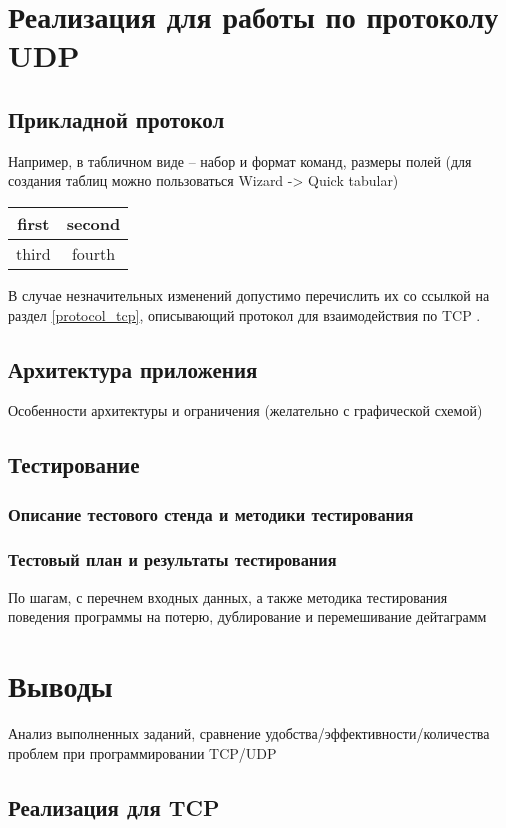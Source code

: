 \documentclass[12pt,a4paper]{report}
\begin{document}
\chapter{Реализация для работы по протоколу UDP}
\section{Прикладной протокол}

Например, в табличном виде -- набор и формат команд, размеры полей
(для создания таблиц можно пользоваться Wizard -> Quick tabular)


\begin{tabular}{|c|c|}
\hline
first & second \\
\hline
third & fourth \\
\hline
\end{tabular}


В случае незначительных изменений допустимо перечислить их со ссылкой на раздел \ref{protocol_tcp}, описывающий протокол для взаимодействия по TCP .

\section{Архитектура приложения}
Особенности архитектуры и ограничения (желательно с графической схемой)

\section{Тестирование}
\subsection{Описание тестового стенда и методики тестирования}
\subsection{Тестовый план и результаты тестирования}
По шагам, с перечнем входных данных,
а также  методика тестирования поведения программы на потерю, дублирование и перемешивание дейтаграмм

\chapter{Выводы}
Анализ выполненных заданий, сравнение удобства/эффективности/количества проблем при программировании TCP/UDP
\section{Реализация для TCP}
\end{document}
